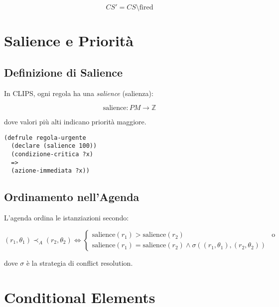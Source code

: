 \begin{equation}
CS' = CS \setminus \text{fired}
\end{equation}

\section{Salience e Priorità}

\subsection{Definizione di Salience}

In CLIPS, ogni regola ha una \textit{salience} (salienza):

\begin{equation}
\text{salience}: PM \to \mathbb{Z}
\end{equation}

dove valori più alti indicano priorità maggiore.

\begin{esempio}
\begin{lstlisting}[language=CLIPS]
(defrule regola-urgente
  (declare (salience 100))
  (condizione-critica ?x)
  =>
  (azione-immediata ?x))
\end{lstlisting}
\end{esempio}

\subsection{Ordinamento nell'Agenda}

L'agenda ordina le istanziazioni secondo:

\begin{equation}
(r_1, \theta_1) \prec_A (r_2, \theta_2) \Leftrightarrow 
\begin{cases}
\text{salience}(r_1) > \text{salience}(r_2) & \text{o}\\
\text{salience}(r_1) = \text{salience}(r_2) \land \sigma((r_1, \theta_1), (r_2, \theta_2)) & 
\end{cases}
\end{equation}

dove $\sigma$ è la strategia di conflict resolution.

\section{Conditional Elements}

